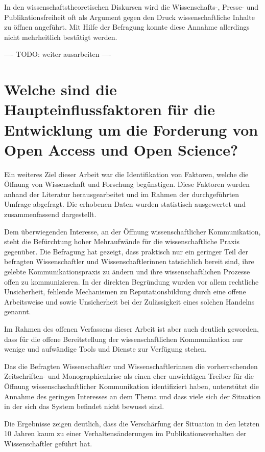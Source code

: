 In den wissenschaftstheoretischen Diskursen wird die Wissenschafts-, Presse- und Publikationsfreiheit oft als Argument gegen den Druck wissenschaftliche Inhalte zu öffnen angeführt. Mit Hilfe der Befragung konnte diese Annahme allerdings nicht mehrheitlich bestätigt werden.

---- TODO: weiter ausarbeiten ----

\section{Welche sind die Haupteinflussfaktoren für die Entwicklung um die Forderung von Open Access und Open Science?}

Ein weiteres Ziel dieser Arbeit war die Identifikation von Faktoren, welche die Öffnung von Wissenschaft und Forschung begünstigen. Diese Faktoren wurden anhand der Literatur herausgearbeitet und im Rahmen der durchgeführten Umfrage abgefragt. Die erhobenen Daten wurden statistisch ausgewertet und zusammenfassend dargestellt.

Dem überwiegenden Interesse, an der Öffnung wissenschaftlicher Kommunikation, steht die Befürchtung hoher Mehraufwände für die wissenschaftliche Praxis gegenüber. Die Befragung hat gezeigt, dass praktisch nur ein geringer Teil der befragten Wissenschaftler und Wissenschaftlerinnen tatsächlich bereit sind, ihre gelebte Kommunikationspraxis zu ändern und ihre wissenschaftlichen Prozesse offen zu kommunizieren. In der direkten Begründung wurden vor allem rechtliche Unsicherheit, fehlende Mechanismen zu Reputationsbildung durch eine offene Arbeitsweise und sowie Unsicherheit bei der Zulässigkeit eines solchen Handelns genannt.

Im Rahmen des offenen Verfassens dieser Arbeit ist aber auch deutlich geworden, dass für die offene Bereitstellung der wissenschaftlichen Kommunikation nur wenige und aufwändige Tools und Dienste zur Verfügung stehen.

Das die Befragten Wissenschaftler und Wissenschaftlerinnen die vorherrschenden Zeitschriften- und Monographienkrise als einen eher unwichtigen Treiber für die Öffnung wissenschschaftlicher Kommunikation identifiziert haben, unterstützt die Annahme des geringen Interesses an dem Thema und dass viele sich der Situation in der sich das System befindet nicht bewusst sind.

Die Ergebnisse zeigen deutlich, dass die Verschärfung der Situation in den letzten 10 Jahren kaum zu einer Verhaltensänderungen im Publikationsverhalten der Wissenschaftler geführt hat.

